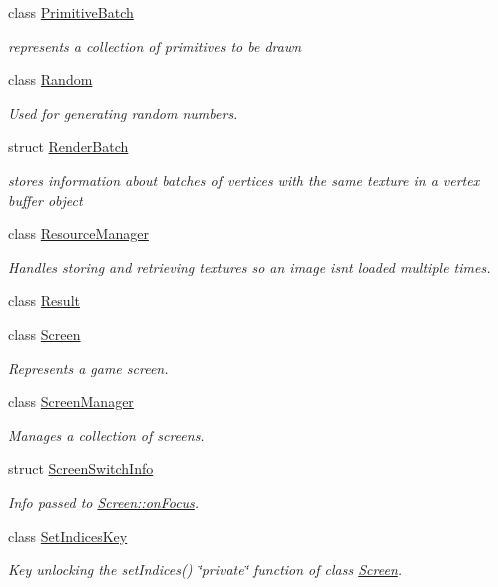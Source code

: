 \begin{DoxyCompactItemize}
class \hyperlink{classnta_1_1PrimitiveBatch}{Primitive\+Batch}
\begin{DoxyCompactList}\small\item\em represents a collection of primitives to be drawn \end{DoxyCompactList}\item 
class \hyperlink{classnta_1_1Random}{Random}
\begin{DoxyCompactList}\small\item\em Used for generating random numbers. \end{DoxyCompactList}\item 
struct \hyperlink{structnta_1_1RenderBatch}{Render\+Batch}
\begin{DoxyCompactList}\small\item\em stores information about batches of vertices with the same texture in a vertex buffer object \end{DoxyCompactList}\item 
class \hyperlink{classnta_1_1ResourceManager}{Resource\+Manager}
\begin{DoxyCompactList}\small\item\em Handles storing and retrieving textures so an image isn\textquotesingle{}t loaded multiple times. \end{DoxyCompactList}\item 
class \hyperlink{classnta_1_1Result}{Result}
\item 
class \hyperlink{classnta_1_1Screen}{Screen}
\begin{DoxyCompactList}\small\item\em Represents a game screen. \end{DoxyCompactList}\item 
class \hyperlink{classnta_1_1ScreenManager}{Screen\+Manager}
\begin{DoxyCompactList}\small\item\em Manages a collection of screens. \end{DoxyCompactList}\item 
struct \hyperlink{structnta_1_1ScreenSwitchInfo}{Screen\+Switch\+Info}
\begin{DoxyCompactList}\small\item\em Info passed to \hyperlink{classnta_1_1Screen_a895548cdf2a5170d671983fc9189579a}{Screen\+::on\+Focus}. \end{DoxyCompactList}\item 
class \hyperlink{classnta_1_1SetIndicesKey}{Set\+Indices\+Key}
\begin{DoxyCompactList}\small\item\em Key unlocking the set\+Indices() \char`\"{}private\char`\"{} function of class \hyperlink{classnta_1_1Screen}{Screen}. \end{DoxyCompactList}\item 

\end{DoxyCompactItemize}

